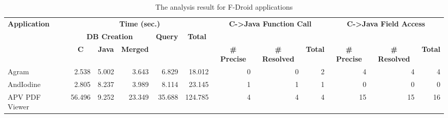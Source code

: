 \begin{table*}[t]
  \vspace{2mm}
  \caption{The analysis result for F-Droid applications}
  \label{table:RQ2}
  \vspace*{-1em}
  \centering
  \small
  \begin{tabular}{l||r|r|r|r|r||r|r|r||r|r|r}
    \multirow{3}{*}{\textbf{Application}} & \multicolumn{5}{c||}{\textbf{Time (sec.)}} & \multicolumn{3}{c||}{\multirow{2}{*}{\textbf{C->Java Function Call}}} & \multicolumn{3}{c}{\multirow{2}{*}{\textbf{C->Java Field Access}}} \\\hhline{~||-----||~~~||~~~}
    & \multicolumn{3}{c|}{\textbf{DB Creation}} & \multicolumn{1}{c|}{\multirow{2}{*}{\textbf{Query}}} & \multicolumn{1}{c||}{\multirow{2}{*}{\textbf{Total}}} & \multicolumn{3}{c||}{} & \multicolumn{3}{c}{} \\\hhline{~||---~|~||------}
    & \multicolumn{1}{c|}{\textbf{C}} & \multicolumn{1}{c|}{\textbf{Java}} & \multicolumn{1}{c|}{\textbf{Merged}} & \multicolumn{1}{c|}{} & \multicolumn{1}{c||}{} & \multicolumn{1}{c|}{\textbf{\# Precise}} & \multicolumn{1}{c|}{\textbf{\# Resolved}} & \multicolumn{1}{c||}{\textbf{Total}} & \multicolumn{1}{c|}{\textbf{\# Precise}} & \multicolumn{1}{c|}{\textbf{\# Resolved}} & \multicolumn{1}{l}{\textbf{Total}}  \\\hhline{=#*{4}{=|}=#=|=|=#=|=|=}
  Agram                  & 2.538                 & 5.002                    & 3.643                      & 6.829                                      & 18.012                                  & 0                           & 0                            & 2                         & 4                           & 4                            & 4                          \\
  AndIodine              & 2.805                 & 8.237                    & 3.989                      & 8.114                                      & 23.145                                  & 1                           & 1                            & 1                         & 0                           & 0                            & 0                          \\
  APV PDF Viewer         & 56.496                & 9.252                    & 23.349                     & 35.688                                     & 124.785                                 & 4                           & 4                            & 4                         & 15                          & 15                           & 16                         \\

\end{tabular}
\end{table*}
